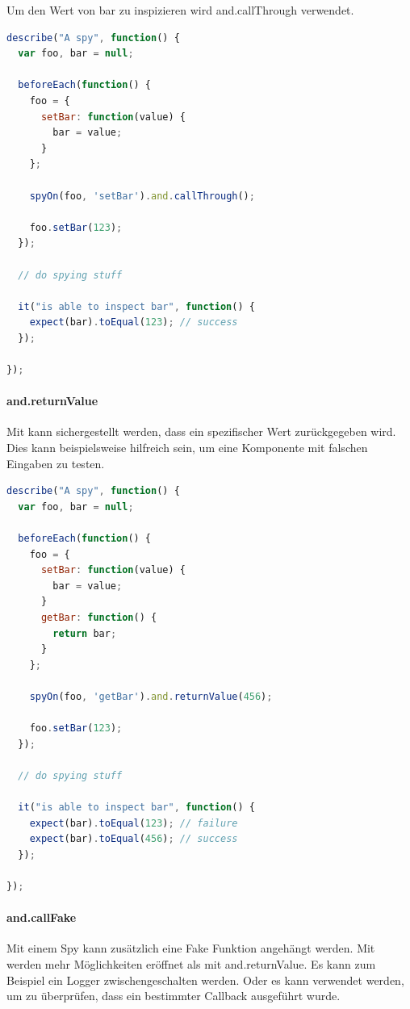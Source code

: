 Um den Wert von bar zu inspizieren wird and.callThrough verwendet.
\begin{lstlisting}[language=JavaScript]
describe("A spy", function() {
  var foo, bar = null;

  beforeEach(function() {
    foo = {
      setBar: function(value) {
        bar = value;
      }
    };

    spyOn(foo, 'setBar').and.callThrough();

    foo.setBar(123);
  });

  // do spying stuff

  it("is able to inspect bar", function() {
    expect(bar).toEqual(123); // success
  });

});
\end{lstlisting}

\paragraph{and.returnValue}
Mit  kann sichergestellt werden, dass ein spezifischer Wert zurückgegeben wird. Dies kann beispielsweise hilfreich sein, um eine Komponente mit falschen Eingaben zu testen.

\begin{lstlisting}[language=JavaScript]
describe("A spy", function() {
  var foo, bar = null;

  beforeEach(function() {
    foo = {
      setBar: function(value) {
        bar = value;
      }
      getBar: function() {
        return bar;
      }
    };

    spyOn(foo, 'getBar').and.returnValue(456);

    foo.setBar(123);
  });

  // do spying stuff

  it("is able to inspect bar", function() {
    expect(bar).toEqual(123); // failure
    expect(bar).toEqual(456); // success
  });

});
\end{lstlisting}

\paragraph{and.callFake}
Mit einem Spy kann zusätzlich eine Fake Funktion angehängt werden. Mit  werden mehr Möglichkeiten eröffnet als mit and.returnValue. Es kann zum Beispiel ein Logger zwischengeschalten werden. Oder es kann verwendet werden, um zu überprüfen, dass ein bestimmter Callback ausgeführt wurde.

